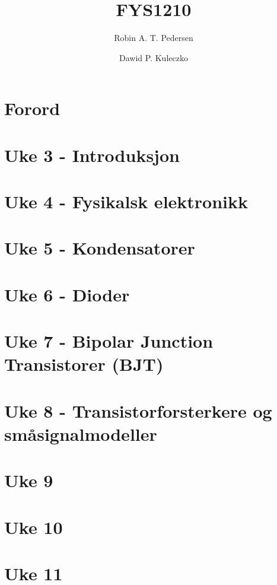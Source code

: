 \documentclass{article}
\begin{document}
  \title{FYS1210}
  \author{Robin A. T. Pedersen \and Dawid P. Kuleczko}
  \maketitle
  \tableofcontents

  \section{Forord}
    

  \section{Uke 3 - Introduksjon}
    

  \section{Uke 4 - Fysikalsk elektronikk}
    

  \section{Uke 5 - Kondensatorer}
    

  \section{Uke 6 - Dioder}
    

  \section{Uke 7 - Bipolar Junction Transistorer (BJT)}
    

  \section{Uke 8 - Transistorforsterkere og småsignalmodeller}
    

  \section{Uke 9}
  \section{Uke 10}
  \section{Uke 11}
\end{document}
